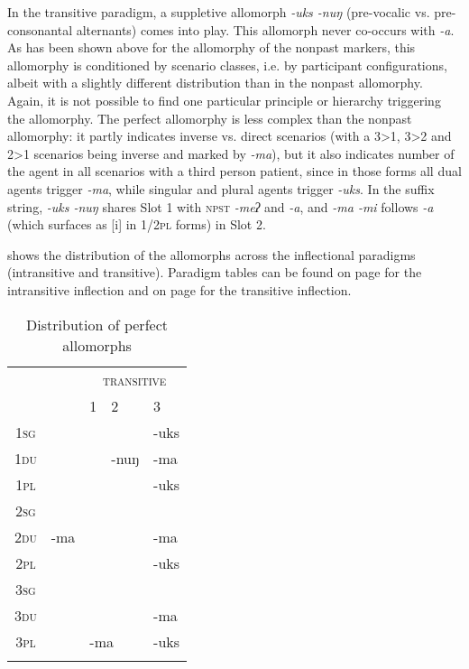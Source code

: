 In the transitive paradigm, a suppletive allomorph \emph{-uks \ti -nuŋ} (pre-vocalic vs. pre-consonantal alternants) comes into play. This allomorph never co-occurs with \emph{-a}. As has been shown above for the allomorphy of the nonpast markers, this allomorphy is conditioned by scenario classes, i.e. by participant configurations, albeit with a slightly different distribution than in the nonpast allomorphy. Again, it is  not possible to find one particular  principle or hierarchy triggering the allomorphy. The perfect allomorphy is less complex than the nonpast allomorphy: it partly indicates inverse vs. direct scenarios (with a 3>1, 3>2 and 2>1 scenarios being inverse and marked by \emph{-ma}), but it also indicates number of the agent in all scenarios with a third person patient, since in those forms all dual agents trigger \emph{-ma}, while singular and plural agents trigger \emph{-uks}. In the suffix string, \emph{-uks \ti -nuŋ} shares Slot 1 with {\scshape npst} \emph{-meʔ} and   \emph{-a}, and \emph{-ma \ti -mi} follows  \emph{-a} (which surfaces as [i] in {\scshape  1/2pl} forms)  in Slot 2.

 shows the distribution of the allomorphs across the inflectional paradigms (intransitive and transitive). Paradigm tables can be found on page \pageref{par-apma-pst} for the intransitive inflection and on page \pageref{par-chimd-prf} for the transitive inflection. 

\begin{table}
\begin{centering} 
\begin{tabular}{ccp{1.5cm}p{1.5cm}p{1.5cm}}
\lsptoprule
		& {\multirow{2}{*}{\scshape intransitive}}&	\multicolumn{3}{c}{ {\scshape transitive}}  \\
		\cline{3-5}
		&&	 {\scshape 1}&  {\scshape 2} & {\scshape  3} \\
\midrule
 {\scshape 1sg} 		&& \cellcolor[gray]{.8}&&-uks \\
 \cline{1-1} \cline{5-5} 		
 {\scshape 1du}		& & \cellcolor[gray]{.8}&-nuŋ&-ma\\
 \cline{1-1} \cline{5-5} 			
 {\scshape 1pl}	&& \cellcolor[gray]{.8}&&-uks \\
 \cline{1-1}  \cline{3-4} 		
 {\scshape 2sg	}	& &&\cellcolor[gray]{.8} &   \\
 \cline{1-1} \cline{5-5}			
 {\scshape 2du}	&-ma &&\cellcolor[gray]{.8}  &-ma\\
 \cline{1-1} \cline{5-5}			
 {\scshape 2pl}	& &&\cellcolor[gray]{.8}   &-uks \\
\cline{1-1}  \cline{4-4} 
 {\scshape 3sg}		&&\multicolumn{2}{c}{}  & \\
  \cline{1-1}  \cline{5-5}					
 {\scshape 3du}&&\multicolumn{2}{c}{}  &-ma\\
 \cline{1-1} \cline{5-5}
 {\scshape 3pl}& &\multicolumn{2}{l}{-ma}  &-uks \\
\lspbottomrule
\end{tabular}
\caption{Distribution of perfect allomorphs}\label{par-prf-allo}
\end{centering}
\end{table}

